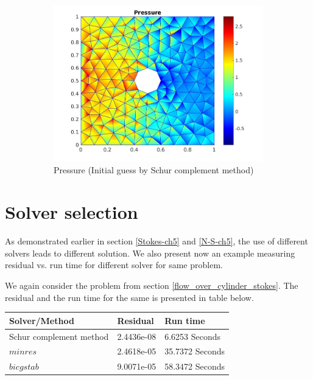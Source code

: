 \documentclass[a4paper]{book}
\begin{document}
\begin{figure}
\begin{subfigure}{\textwidth}
  \includegraphics[width=\linewidth]{cylinder_newton_pressure_schur.jpg}
  \caption{Pressure (Initial guess by Schur complement method)}
  \label{pressure_navier_stoke_schur}
\end{subfigure}
\caption{\label{flow_over_cylinder_schur_n_s}}
\end{figure}

\section{Solver selection}

As demonstrated earlier in section \ref{Stokes-ch5} and \ref{N-S-ch5}, the use of different solvers leads to different solution. We also present now an example measuring residual vs. run time for different solver for same problem.

We again consider the problem from section \ref{flow_over_cylinder_stokes}. The residual and the run time for the same is presented in table below.

\begin{longtable}{| p{} | p{} | p{} |}
\hline
\textbf{Solver/Method} & \textbf{Residual} & \textbf{Run time}\\
\hline
Schur complement method & 2.4436e-08 & 6.6253 Seconds\\
\hline
$minres$ & 2.4618e-05 & 35.7372 Seconds\\
\hline
$bicgstab$ & 9.0071e-05 & 58.3472 Seconds\\
\hline
\end{longtable}
\end{document}
